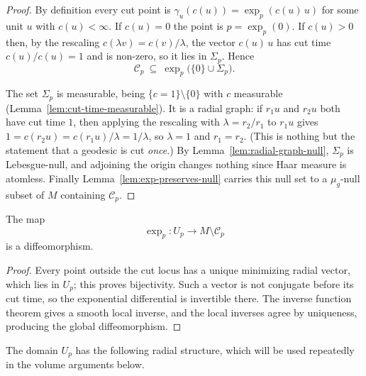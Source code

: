 \begin{proof}
\sketch
{}

By definition every cut point is $\gamma_u(c(u))=\exp_p(c(u)\,u)$ for
some unit $u$ with $c(u)<\infty$. If $c(u)=0$ the point is
$p=\exp_p(0)$. If $c(u)>0$ then, by the rescaling
$c(\lambda v)=c(v)/\lambda$, the vector $c(u)\,u$ has cut time
$c(u)/c(u)=1$ and is non-zero, so it lies in $\Sigma_p$. Hence
$${\mathcal C}_p\ \subseteq\ \exp_p\bigl(\{0\}\cup\Sigma_p\bigr).$$

The set $\Sigma_p$ is measurable, being $\{c=1\}\setminus\{0\}$ with
$c$ measurable (Lemma~\ref{lem:cut-time-measurable}). It is a radial
graph: if $r_1u$ and $r_2u$ both have cut time $1$, then applying the
rescaling with $\lambda=r_2/r_1$ to $r_1u$ gives
$1=c(r_2u)=c(r_1u)/\lambda=1/\lambda$, so $\lambda=1$ and $r_1=r_2$.
(This is nothing but the statement that a geodesic is cut \emph{once}.)
By Lemma~\ref{lem:radial-graph-null}, $\Sigma_p$ is Lebesgue-null, and
adjoining the origin changes nothing since Haar measure is atomless.
Finally Lemma~\ref{lem:exp-preserves-null} carries this null set to a
$\mu_g$-null subset of $M$ containing ${\mathcal C}_p$.
\end{proof}

\begin{proposition}
\label{prop:exponential-diffeomorphism-cut-locus}




The map
$$\exp_p\colon U_p\to M\setminus {\mathcal C}_p$$
is a diffeomorphism. \end{proposition}

\begin{proof}
\sketch
{}
Every point outside the cut locus has a unique minimizing radial vector, which lies in $U_p$; this proves bijectivity. Such a vector is not conjugate before its cut time, so the exponential differential is invertible there. The inverse function theorem gives a smooth local inverse, and the local inverses agree by uniqueness, producing the global diffeomorphism.
\end{proof}

The domain $U_p$ has the following radial structure, which will be
used repeatedly in the volume arguments below.

